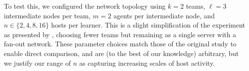 \documentclass[10pt, times, comsoc]{IEEEtran}
\newcommand{\wvec}[1]{\ensuremath{\bm{w}_{#1}}}
\begin{document}
To test this, we configured the network topology using $k=2$ teams, $\ell=3$ intermediate nodes per team, $m=2$ agents per intermediate node, and $n \in \{2, 4, 8, 16\}$ hosts per learner.
This is a slight simplification of the  experiment as presented by \textcite{DBLP:journals/eaai/MalialisK15}, choosing fewer teams but remaining as a single server with a fan-out network.
These parameter choices match those of the original study to enable direct comparison, and are (to the best of our knowledge) arbitrary, but we justify our range of $n$ as capturing increasing scales of host activity.
\end{document}

